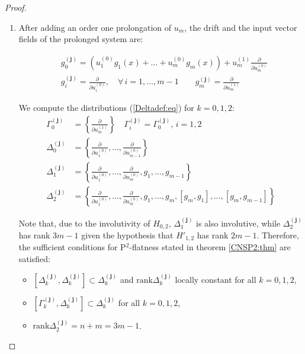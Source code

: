 \documentclass[10pt]{article}
\newcommand{\3}{\mathbf{3}}
\newcommand{\2}{\mathbf{2}}
\newcommand{\1}{\mathbf{1}}
\newcommand{\0}{\mathbf{0}}
\newcommand{\mbf}[1]{\mathbf{#1}}
\newcommand{\rk}{\mathrm{rank}}
\newcommand{\ddu}[2]{\frac{\partial}{\partial u_{#1}^{(#2)}}}
\begin{document}
\begin{proof}
\begin{enumerate}
  \item After adding an order one prolongation of $u_m$, the drift and the input vector fields  of the prolonged system are:

\begin{equation}\label{prolvecfields5states-minputs:eq}
\begin{aligned}
&g_{0}^{(\mbf{j})}= \left(u_{1}^{(0)}g_{1}(x) + \dots + u_{m}^{(0)}g_{m}(x)\right) +   u_{m}^{(1)}\ddu{m}{0}\\
&g_{i}^{(\mbf{j})}= \ddu{i}{0}, \quad \forall \, i=1,\dots,m-1 \qquad g_{m}^{(\mbf{j})}= \ddu{m}{1}
\end{aligned}
\end{equation}

We compute the distributions (\ref{Deltadef:eq}) for $k=0,1,2$:
\begin{equation}
\begin{aligned}
\Gamma_{0}^{(\mbf{j})} &= \left\{ \ddu{m}{1} \right\} \quad \Gamma_{i}^{(\mbf{j})}=\Gamma_{0}^{(\mbf{j})}, \, i=1,2 \\
\Delta_{0}^{(\mbf{j})} &= \left\{ \ddu{1}{0},\dots  , \ddu{m-1}{0} \right\}\\
\Delta_{1}^{(\mbf{j})} &= \left\{ \ddu{1}{0}, \dots  , \ddu{m}{0}, g_1,\dots, g_{m-1} \right\}\\
\Delta_{2}^{(\mbf{j})} &= \left\{ \ddu{1}{0}, \dots, \ddu{m}{0}, g_1, \dots ,g_m,[g_m,g_1],\dots, [g_m,g_{m-1}] \right\}
\end{aligned}
\end{equation}

Note that, due to the involutivity of $H_{0,2}$, $\Delta_{1}^{(\mbf{j})}$ is also involutive, while
$ \Delta_{2}^{(\mbf{j})} $ has rank $3m-1$ given the hypothesis that $H'_{1,2}$ has rank $2m-1$. Therefore, the sufficient
conditions for P$^2$-flatness stated in theorem \ref{CNSP2:thm} are satisfied:
\begin{itemize}
\item[(i)] $[\Delta_{k}^{(\mbf{j})}, \Delta_{k}^{(\mbf{j})}] \subset \Delta_{k}^{(\mbf{j})}$ and $\rk \Delta_{k}^{(\mbf{j})}$  locally constant for all $k=0,1,2$,
\item[(ii)]$[\Gamma_{k}^{(\mbf{j})}, \Delta_{k}^{(\mbf{j})}] \subset \Delta_{k}^{(\mbf{j})}$ for all $k=0,1,2$,
\item[(iii)] $\rk \Delta_{2}^{(\mbf{j})} = n+m=3m-1$.
\end{itemize}


\end{enumerate}
\end{proof}
\end{document}
